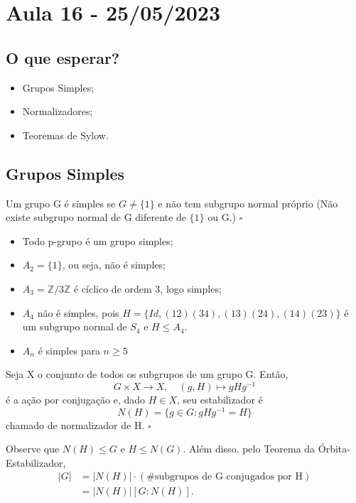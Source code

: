 \documentclass[algebra_notes.tex]{subfiles}
\begin{document}
\section{Aula 16 - 25/05/2023}
\subsection{O que esperar?}
\begin{itemize}
	\item Grupos Simples;
	\item Normalizadores;
	\item Teoremas de Sylow.
\end{itemize}
\subsection{Grupos Simples}
\begin{def*}
	Um grupo G é simples se \(G\neq\{1\}\) e não tem subgrupo normal próprio (Não
	existe subgrupo normal de G diferente de \(\{1\}\) ou G.) \(\square\)
\end{def*}
\begin{example*}
	\begin{itemize}
		\item Todo p-grupo é um grupo simples;
		\item \(A_{2}=\{1\}\), ou seja, não é simples;
		\item \(A_{3} = \mathbb{Z}/3 \mathbb{Z}\) é cíclico de ordem 3, logo simples;
		\item \(A_{4}\) não é simples, pois \(H = \{Id, (12)(34), (13)(24), (14)(23)\}\)
		      é um subgrupo normal de \(S_{4}\) e \(H\leq A_{4}.\)
		\item \(A_{n}\) é simples para \(n\geq 5\)
	\end{itemize}
\end{example*}
\begin{def*}
	Seja X o conjunto de todos os subgrupos de um grupo G. Então,
	\[
		G\times X\rightarrow X,\quad (g, H)\mapsto gHg^{-1}
	\]
	é a ação por conjugação e, dado \(H\in X\), seu estabilizador é
	\[
		N(H) = \{g\in G: gHg^{-1}=H\}
	\]
	chamado de normalizador de H. \(\square\)
\end{def*}
Observe que \(N(H)\leq G\) e \(H\leq N(G)\). Além disso, pelo Teorema da Órbita-Estabilizador,
\begin{align*}
	|G| & = |N(H)|\cdot (\#\text{subgrupos de G conjugados por H}) \\
	    & = |N(H)|[G:N(H)].
\end{align*}
\end{document}

